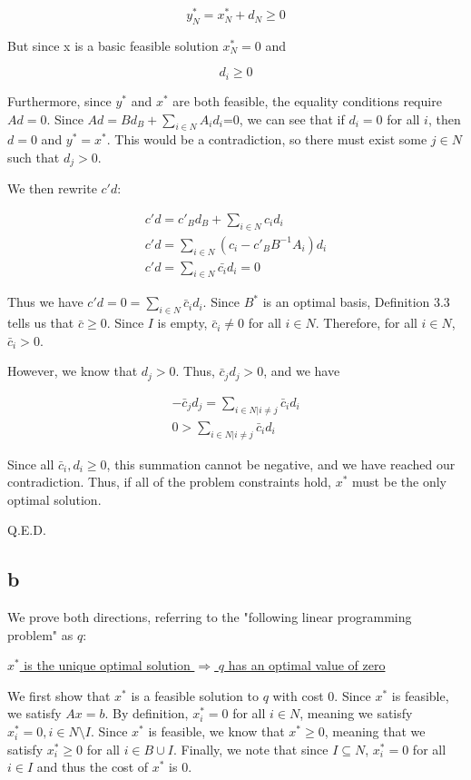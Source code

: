 \documentclass[11pt,a4paper]{article}
\begin{document}
$$
y^*_N = x^*_N+d_N\geq 0
$$

But since x is a basic feasible solution $x_N^*=0$ and

$$
d_i\geq 0
$$

Furthermore, since $y^*$ and $x^*$ are both feasible, the equality conditions require $Ad=0$. Since $Ad=Bd_B+\sum_{i\in N}A_id_i$=0, we can see that if $d_i=0$ for all $i$, then $d=0$ and $y^*=x^*$. This would be a contradiction, so there must exist some $j\in N$ such that $d_j>0$. 

We then rewrite $c'd$:

\begin{equation}
\begin{split}
c'd=c'_Bd_B + \sum_{i\in N}c_id_i\\
c'd=\sum_{i\in N}(c_i-c'_BB^{-1}A_i)d_i\\
c'd=\sum_{i\in N}\bar{c_i}d_i=0
\end{split}
\end{equation}

Thus we have $c'd=0=\sum_{i\in N}\bar{c}_id_i$. Since $B^*$ is an optimal basis, Definition 3.3 tells us that $\bar{c}\geq 0$. Since $I$ is empty, $\bar{c}_i\neq 0$ for all $i\in N$. Therefore, for all $i\in N$, $\bar{c}_i>0$. 

However, we know that $d_j>0$. Thus, $\bar{c}_jd_j>0$, and we have

\begin{equation}
\begin{split}
-\bar{c}_jd_j=\sum_{i\in N|i\neq j}\bar{c}_id_i\\
0>\sum_{i\in N|i\neq j}\bar{c}_id_i
\end{split}
\end{equation}

Since all $\bar{c}_i, d_i\geq0$, this summation cannot be negative, and we have reached our contradiction. Thus, if all of the problem constraints hold, $x^*$ must be the only optimal solution.

Q.E.D.

\subsection*{b}

We prove both directions, referring to the "following linear programming problem" as $q$:

\underline{$x^*$ is the unique optimal solution $\Rightarrow$ $q$ has an optimal value of zero}

We first show that $x^*$ is a feasible solution to $q$ with cost $0$. Since $x^*$ is feasible, we satisfy $Ax=b$. By definition, $x^*_i=0$ for all $i\in N$, meaning we satisfy $x^*_i=0, i\in N\texttt{\textbackslash} I$. Since $x^*$ is feasible, we know that $x^*\geq 0$, meaning that we satisfy $x^*_i\geq 0$ for all $i\in B\cup I$. Finally, we note that since $I\subseteq N$, $x^*_i=0$ for all $i\in I$ and thus the cost of $x^*$ is 0. 
\end{document}
